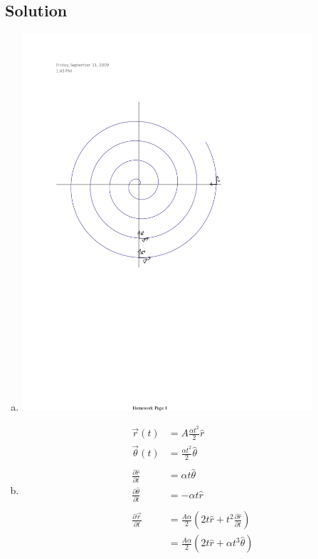 \documentclass[solutions]{esg8012pset}
\begin{document}
\subsection*{Solution}
  \begin{enumerate}[a.]
    \item \includegraphics[width=0.85\textwidth]{ps01_Diagram_3}
    \item \begin{align*}
            \vec r(t) & = A\frac{\alpha t^2}{2} \hat r \\
            \vec \theta(t) & = \frac{\alpha t^2}{2} \hat\theta \\
            \\
            \frac{\partial \hat r}{\partial t} & = \alpha t \hat \theta \\
            \frac{\partial \hat \theta}{\partial t} & = -\alpha t \hat r \\
            \\
            \frac{\partial \vec r}{\partial t} & = \frac{A\alpha}{2}\left( 2t\hat r + t^2\frac{\partial \hat r}{\partial t}\right) \\
            & = \frac{A\alpha}{2}\left( 2t\hat r + \alpha t^3 \hat \theta\right) \\

\end{align*}
\end{enumerate}
\end{document}
